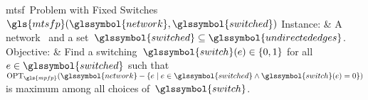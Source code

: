 \begin{problem}[framed]{\gls{mtsf}~Problem with Fixed Switches~$\gls{mtsfp}
(\glssymbol{network},\glssymbol{switched})$} 
    Instance: & A network~ and a
    set~$\glssymbol{switched}\subseteq\glssymbol{undirectededges}$.
    \\
    Objective: & Find a switching~$\glssymbol{switch}(\edge)\in\{0,1\}$ for
    all~$\edge\in\glssymbol{switched}$ such that~$\opt_{\gls{mpfp}}
    (\glssymbol{network}-\{\edge\mid\edge\in
    \glssymbol{switched}\land\glssymbol{switch}(\edge)=0\})$ is maximum among
    all choices of~$\glssymbol{switch}$.
\end{problem} 
